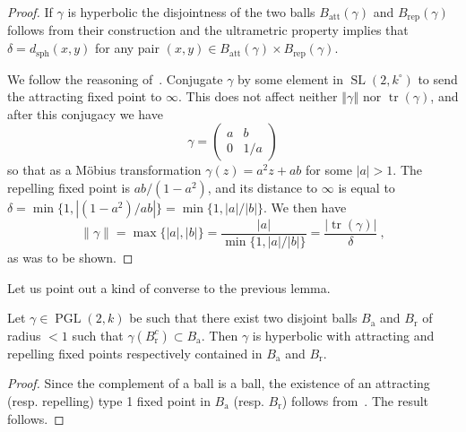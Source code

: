 \documentclass[AHL,Unicode,longabstracts]{cedram}
\DeclareMathOperator{\tr}{tr}
\DeclareMathOperator{\sph}{sph}
\DeclareMathOperator{\SL}{SL}
\DeclareMathOperator{\PGL}{PGL}
\newcommand{\norm}[1]{\left\Vert#1\right\Vert}
\newcommand{\abs}[1]{\left\vert#1\right\vert}
\newcommand{\att}{\mathrm{att}}
\newcommand{\rep}{\mathrm{rep}}
\begin{document}
\begin{proof}
If $\gamma$ is hyperbolic the disjointness of the two balls $B_\att(\gamma)$ and $B_\rep(\gamma)$ follows from their construction and the ultrametric property implies that $\delta = d_{\sph} (x,y)$ for any pair $(x,y)\in B_\att(\gamma) \times B_\rep(\gamma)$.

We follow the reasoning of~\cite[Lem.~2.1]{kleinbif}. Conjugate $\gamma$ by some element in $\SL(2,k^\circ)$ to send the attracting fixed point to $\infty$. This does not affect neither $\norm{\gamma}$ nor $\tr(\gamma)$, and after this
conjugacy we have
\[
\gamma =
\begin{pmatrix} a & b \\ 0 & 1/a
\end{pmatrix}
\]
so that as a M\"obius transformation
$\gamma(z) = a^2z+ ab$ for some $\abs{a}>1$. The repelling fixed point is $ab/(1-a^2)$, and its distance to $\infty$ is equal to $\delta = \min \{ 1, |(1-a^2)/ab|\} = \min \{ 1, {\abs{a}}/{\abs{b}}\}$. We then have
\[
\| \gamma \| = \max\{ |a|, |b|\} = \frac{|a|}{\min \{ 1, {\abs{a}}/{\abs{b}}\}} = \frac{|\tr(\gamma)|}{\delta}~,
\]
as was to be shown.
\end{proof}

Let us point out a kind of converse to the previous lemma.

\begin{lemm}\label{lem:distinct balls}
Let $\gamma \in \PGL(2,k)$ be such that there exist two disjoint balls $B_\mathrm{a}$ and $B_\mathrm{r}$ of radius $<1$ such that $\gamma(B_\mathrm{r}^c)\subset B_\mathrm{a}$. Then $\gamma$ is hyperbolic with attracting and repelling fixed points respectively contained in $B_\mathrm{a}$ and $B_\mathrm{r}$.
\end{lemm}

\begin{proof}
Since the complement of a ball is a ball, the existence of an attracting (resp. repelling) type 1 fixed point in $B_\mathrm{a}$ (resp. $B_\mathrm{r}$) follows from~\cite[Thm.~10.69]{baker-rumely}. The result follows.
\end{proof}
\end{document}
